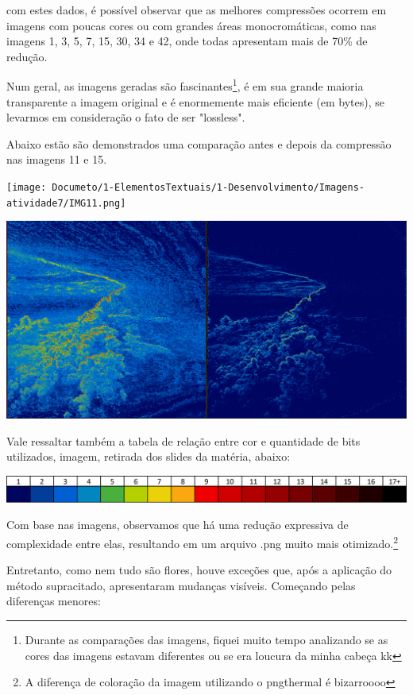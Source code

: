\paragrafo com estes dados, é possível observar que as melhores compressões ocorrem em imagens com poucas cores ou com grandes áreas monocromáticas, como nas imagens 1, 3, 5, 7, 15, 30, 34 e 42, onde todas apresentam mais de 70\% de redução.

\paragrafo Num geral, as imagens geradas são fascinantes\footnote{Durante as comparações das imagens, fiquei muito tempo analizando se as cores das imagens estavam diferentes ou se era loucura da minha cabeça kk}, é em sua grande maioria transparente a imagem original e é enormemente mais eficiente (em bytes), se levarmos em consideração o fato de ser "lossless".

\paragrafo Abaixo estão são demonstrados uma comparação antes e depois da compressão nas imagens 11 e 15.

\texttt{[image: Documeto/1-ElementosTextuais/1-Desenvolvimento/Imagens-atividade7/IMG11.png]}

\includegraphics[scale=0.24]{Documeto/1-ElementosTextuais/1-Desenvolvimento/Imagens-atividade7/IMG15.png}

\paragrafo Vale ressaltar também a tabela de relação entre cor e quantidade de bits utilizados, imagem, retirada dos slides da matéria, abaixo:

\includegraphics[scale=0.35]{Documeto/1-ElementosTextuais/1-Desenvolvimento/Imagens-atividade7/Tabela.png}


\paragrafo Com base nas imagens, observamos que há uma redução expressiva de complexidade entre elas, resultando em um arquivo .png muito mais otimizado.\footnote{A diferença de coloração da imagem utilizando o pngthermal é bizarroooo}

\paragrafo Entretanto, como nem tudo são flores, houve exceções que, após a aplicação do método supracitado, apresentaram mudanças visíveis. Começando pelas diferenças menores:

